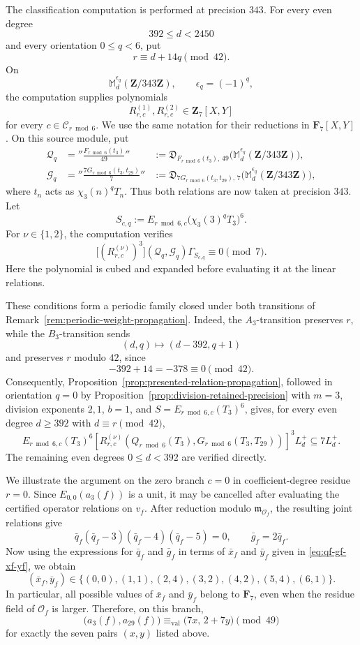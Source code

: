 \documentclass[11pt]{article}
\theoremstyle{plain}
\theoremstyle{definition}
\theoremstyle{remark}
\numberwithin{equation}{section}
\begin{document}
The classification computation is performed at precision \(343\). For every even degree \[ 392\leq d<2450 \] and every orientation \(0\leq q<6\), put \[ r\equiv d+14q\pmod{42}. \] On \[ \mathbb M_d^{\epsilon_q}(\mathbf Z/343\mathbf Z), \qquad \epsilon_q=(-1)^q, \] the computation supplies polynomials \[ R_{r,c}^{(1)},R_{r,c}^{(2)}\in\mathbf Z_7[X,Y] \] for every \(c\in\mathcal C_{r\bmod6}\). We use the same notation for their reductions in \(\mathbf F_7[X,Y]\). On this source module, put
\[
\begin{aligned}
\mathcal Q_q &= ''\frac{F_{r\bmod6}(t_3)}{49}'' &:=\mathfrak D_{F_{r\bmod6}(t_3),\,49} \bigl(\mathbb M_d^{\epsilon_q}(\mathbf Z/343\mathbf Z)\bigr),\\
\mathcal G_q &= ''\frac{7G_{r\bmod6}(t_3,t_{29})}{7}'' &:=\mathfrak D_{7G_{r\bmod6}(t_3,t_{29}),\,7} \bigl(\mathbb M_d^{\epsilon_q}(\mathbf Z/343\mathbf Z)\bigr),
\end{aligned}
\]
where \(t_n\) acts as \(\chi_3(n)^qT_n\).
Thus both relations are now taken at precision \(343\).
Let
\[
S_{c,q}:=E_{r\bmod6,c}\bigl(\chi_3(3)^qT_3\bigr)^6.
\]
For \(\nu\in\{1,2\}\), the computation verifies \[ \bigl[(R_{r,c}^{(\nu)})^3\bigr] (\mathcal Q_q,\mathcal G_q)\Gamma_{S_{c,q}} \equiv0\pmod7.\] Here the polynomial is cubed and expanded before evaluating it at the linear relations.

These conditions form a periodic family closed under both transitions of Remark~\ref{rem:periodic-weight-propagation}. Indeed, the \(A_3\)-transition preserves \(r\), while the \(B_3\)-transition sends \[ (d,q)\longmapsto(d-392,q+1) \] and preserves \(r\) modulo \(42\), since \[ -392+14=-378\equiv0\pmod{42}. \] Consequently, Proposition~\ref{prop:presented-relation-propagation}, followed in orientation \(q=0\) by Proposition~\ref{prop:division-retained-precision} with \(m=3\), division exponents \(2,1\), \(b=1\), and \(S=E_{r\bmod6,c}(T_3)^6\), gives, for every even degree \(d\geq392\) with \(d\equiv r\pmod{42}\), \[ E_{r\bmod6,c}(T_3)^6 \left[ R_{r,c}^{(\nu)}\!\left( Q_{r\bmod6}(T_3), G_{r\bmod6}(T_3,T_{29}) \right) \right]^3L_d^+ \subseteq7L_d^+. \] The remaining even degrees \(0\leq d<392\) are verified directly.

We illustrate the argument on the zero branch \(c = 0\) in coefficient-degree residue \(r=0\). Since \(E_{0,0}(a_3(f))\) is a unit, it may be cancelled after evaluating the certified operator relations on \(v_f\).  After reduction modulo \(\mathfrak m_{\mathcal O_f}\), the resulting joint relations give \[ \bar q_f (\bar q_f-3)(\bar q_f-4)(\bar q_f-5)=0, \qquad \bar g_f=2\bar q_f. \] Now using the expressions for \(\bar q_f\) and \(\bar g_f\) in terms of \(\bar x_f\) and \(\bar y_f\) given in
\eqref{eq:qf-gf-xf-yf}, we obtain \[ (\bar x_f,\bar y_f) \in \{ (0,0),(1,1),(2,4),(3,2), (4,2),(5,4),(6,1) \}. \] In particular, all possible values of \(\bar x_f\) and \(\bar y_f\) belong to \(\mathbf F_7\), even when the residue field of \(\mathcal O_f\) is larger.  Therefore, on this branch, \[ \bigl(a_3(f),a_{29}(f)\bigr) \equiv_{\mathrm{val}} \bigl(7x,\,2+7y\bigr)\pmod{49} \] for exactly the seven pairs \((x,y)\) listed above.
\end{document}
